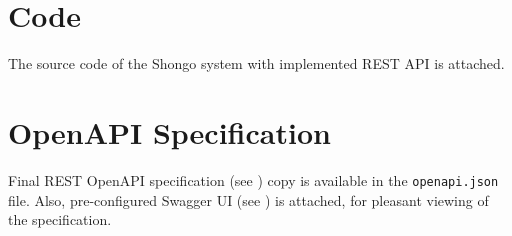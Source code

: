 \chapter{Code}
The source code of the Shongo system with implemented REST API is attached.

\chapter{OpenAPI Specification} \label{ape:documentation}
Final REST OpenAPI specification (see ) copy is available in the \texttt{openapi.json} file.
Also, pre-configured Swagger UI (see ) is attached, for pleasant viewing of the specification.
